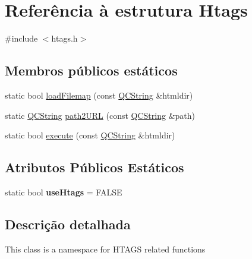 \hypertarget{struct_htags}{\section{Referência à estrutura Htags}
\label{struct_htags}
}


{\ttfamily \#include $<$htags.\-h$>$}

\subsection*{Membros públicos estáticos}
\begin{DoxyCompactItemize}
\item 
static bool \hyperlink{struct_htags_a133f92b5f4e903f4437a88f8fb874170}{load\-Filemap} (const \hyperlink{class_q_c_string}{Q\-C\-String} \&htmldir)
\item 
static \hyperlink{class_q_c_string}{Q\-C\-String} \hyperlink{struct_htags_ab235c80852b32ac76ee0e1a43729758f}{path2\-U\-R\-L} (const \hyperlink{class_q_c_string}{Q\-C\-String} \&path)
\item 
static bool \hyperlink{struct_htags_ac35b091c2e7f1ee94a7e9cf3d64a0b6f}{execute} (const \hyperlink{class_q_c_string}{Q\-C\-String} \&htmldir)
\end{DoxyCompactItemize}
\subsection*{Atributos Públicos Estáticos}
\begin{DoxyCompactItemize}
\item 
\hypertarget{struct_htags_abf1b84276494d6e9546d51762617f6b3}{static bool {\bfseries use\-Htags} = F\-A\-L\-S\-E}\label{struct_htags_abf1b84276494d6e9546d51762617f6b3}

\end{DoxyCompactItemize}


\subsection{Descrição detalhada}
This class is a namespace for H\-T\-A\-G\-S related functions 

